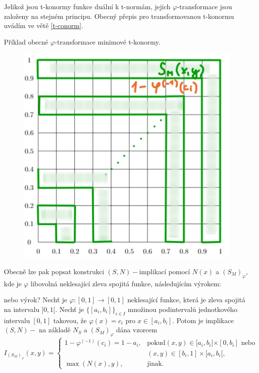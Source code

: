 Jelikož jsou t-konormy funkce duální k t-normám, jejich $\varphi$-transformace jsou založeny na stejném principu. Obecný přepis pro transformovanou t-konormu uvádím ve větě \ref{t-conorm}.
\begin{graph}
    Příklad obecné $\varphi$-transformace minimové t-konormy.
    \begin{figure}[H]
                \hspace{-1cm}
                \includegraphics[scale=0.6]{template-fig/t-konorma.pdf}
                \centering
            \end{figure}
\end{graph}

Obecně lze pak popsat konstrukci $(S,N)-$implikací pomocí $N(x)$ a $\left(S_M\right)_\varphi$, kde je $\varphi$ libovolná neklesající zleva spojitá funkce, následujícím výrokem:
\begin{sentence}
{\color{blue} nebo výrok?}
    Nech\v t je  $\varphi:[0,1]\rightarrow [0,1]$
neklesající funkce, která je zleva spojitá na intervalu $]0,1[$.
Nech\v t je $\{[a_i,b_i]\}_{i\in I}$ množinou podintervalů jednotkového intervalu $[0,1]$ takovou, že $\varphi(x)=c_i$ pro $x\in
[a_i,b_i]$.
Potom je implikace $(S,N)-$ na základě $N_S$ a $(S_M)_{\varphi}$ dána vzorcem
$$ I_{(S_M)_{\varphi}}(x,y) = \begin{cases} 1-\varphi^{(-1)}(c_i)=1-a_i, &\mbox {pokud
$(x,y)\in [a_i,b_i[\times[0,b_i]$ nebo}
\\ & (x,y)\in [b_i,1]\times[a_i,b_i[,
\\ \max(N(x),y), &\mbox {jinak.}
\end{cases} $$
\end{sentence}

